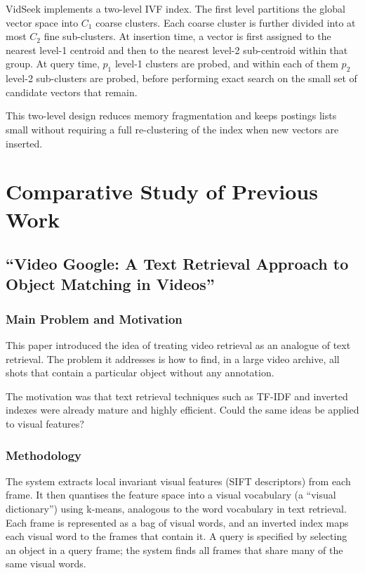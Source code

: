 \documentclass[12pt, a4paper]{report}
\begin{document}
VidSeek implements a two-level IVF index. The first level partitions the
global vector space into $C_1$ coarse clusters. Each coarse cluster is
further divided into at most $C_2$ fine sub-clusters. At insertion time,
a vector is first assigned to the nearest level-1 centroid and then to the
nearest level-2 sub-centroid within that group. At query time, $p_1$ level-1
clusters are probed, and within each of them $p_2$ level-2 sub-clusters
are probed, before performing exact search on the small set of candidate
vectors that remain.

This two-level design reduces memory fragmentation and keeps postings lists
small without requiring a full re-clustering of the index when new vectors
are inserted.

\section{Comparative Study of Previous Work}

\subsection{``Video Google: A Text Retrieval Approach to Object Matching in
Videos'' \cite{sivic2003video}}

\subsubsection{Main Problem and Motivation}

This paper introduced the idea of treating video retrieval as an analogue
of text retrieval. The problem it addresses is how to find, in a large
video archive, all shots that contain a particular object without any
annotation.

The motivation was that text retrieval techniques such as TF-IDF and inverted
indexes were already mature and highly efficient. Could the same ideas be
applied to visual features?

\subsubsection{Methodology}

The system extracts local invariant visual features (SIFT descriptors) from
each frame. It then quantises the feature space into a visual vocabulary
(a ``visual dictionary'') using k-means, analogous to the word vocabulary
in text retrieval. Each frame is represented as a bag of visual words, and
an inverted index maps each visual word to the frames that contain it. A
query is specified by selecting an object in a query frame; the system finds
all frames that share many of the same visual words.
\end{document}
